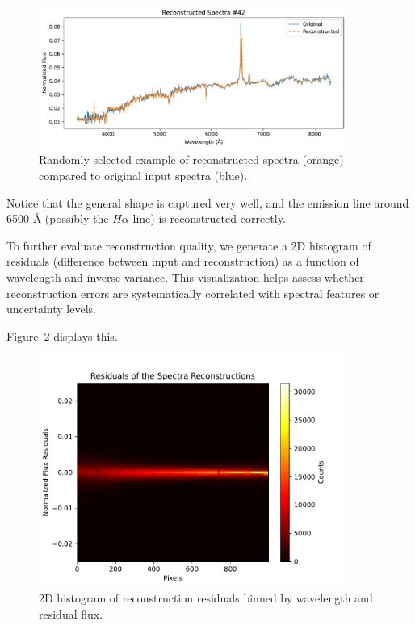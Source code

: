 \documentclass[11pt]{article}
\begin{document}
\begin{figure}[h!]
    \centering
    \includegraphics[width=0.9\textwidth]{spectrum_recon.pdf}
    \caption{Randomly selected example of reconstructed spectra (orange) compared to original input spectra (blue).}
    \label{fig:spectra}
\end{figure}

Notice that the general shape is captured very well, and the emission line around 6500 \AA{} (possibly the $H\alpha$ line) is reconstructed correctly.

To further evaluate reconstruction quality, we generate a 2D histogram of residuals (difference between input and reconstruction) as a function of wavelength and inverse variance. This visualization helps assess whether reconstruction errors are systematically correlated with spectral features or uncertainty levels.

Figure~\ref{fig:residual_histogram} displays this.

\begin{figure}[h!]
    \centering
    \includegraphics[width=0.9\textwidth]{residuals.pdf}
    \caption{2D histogram of reconstruction residuals binned by wavelength and residual flux.}
    \label{fig:residual_histogram}
\end{figure}
\end{document}
